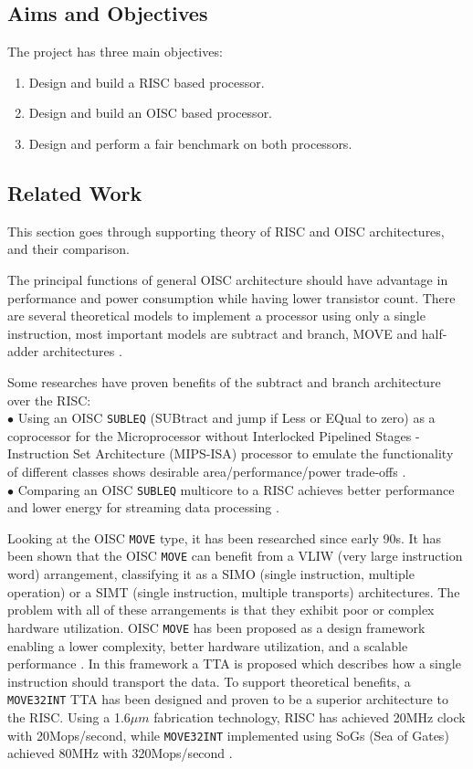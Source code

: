 \subsection{Aims and Objectives}

The project has three main objectives:
\begin{enumerate}
	\item Design and build a RISC based processor.
	\item Design and build an OISC based processor. 
	\item Design and perform a fair benchmark on both processors. 
\end{enumerate}

\subsection{Related Work}
\label{subsec:supporting_theory}
This section goes through supporting theory of RISC and OISC architectures, and their comparison.

The principal functions of general OISC architecture should have advantage in performance and power consumption while having lower transistor count. There are several theoretical models to implement a processor using only a single instruction, most important models are subtract and branch, MOVE and half-adder architectures \autocite{gilreath_laplante_2003}. 

Some researches have proven benefits of the subtract and branch architecture over the RISC:\\
$\bullet$ Using an OISC \texttt{SUBLEQ} (SUBtract and jump if Less or EQual to zero) as a coprocessor for the Microprocessor without Interlocked Pipelined Stages - Instruction Set Architecture (MIPS-ISA) processor to emulate the functionality of different classes shows desirable area/performance/power trade-offs \autocite{ahmed_sakamoto_anderson_hara-azumi_2015}.\\
$\bullet$ Comparing an OISC \texttt{SUBLEQ} multicore to a RISC achieves better performance and lower energy for streaming data processing \autocite{yokota_saso_hara-azumi_2017}.

Looking at the OISC \texttt{MOVE} type, it has been researched since early 90s. It has been shown that the OISC \texttt{MOVE} can benefit from a VLIW (very large instruction word) arrangement, classifying it as a SIMO (single instruction, multiple operation) or a SIMT (single instruction, multiple transports) architectures. The problem with all of these arrangements is that they exhibit poor or complex hardware utilization. OISC \texttt{MOVE} has been proposed as a design framework enabling a lower complexity, better hardware utilization, and a scalable performance \autocite{5348869}. In this framework a TTA is proposed which describes how a single instruction should transport the data. To support theoretical benefits, a \texttt{MOVE32INT} TTA has been designed \autocite{Corporaal94move32int} and proven to be a superior architecture to the RISC. Using a 1.6$\mu m$ fabrication technology, RISC has achieved 20MHz clock with 20Mops/second, while \texttt{MOVE32INT} implemented using SoGs (Sea of Gates) achieved 80MHz with 320Mops/second \autocite{289981}.

